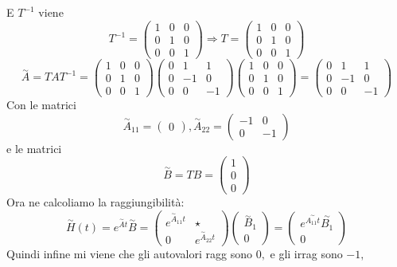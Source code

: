 \documentclass{article}
\begin{document}
E $T^{-1}$ viene \[ T^{-1} = \left(\begin{matrix}1 & 0 & 0\\0 & 1 & 0\\0 & 0 & 1\end{matrix}\right) \Longrightarrow T = \left(\begin{matrix}1 & 0 & 0\\0 & 1 & 0\\0 & 0 & 1\end{matrix}\right) \]
\[ \overset{\sim}{A} = T A  T^{-1} = \left(\begin{matrix}1 & 0 & 0\\0 & 1 & 0\\0 & 0 & 1\end{matrix}\right)\left(\begin{matrix}0 & 1 & 1\\0 & -1 & 0\\0 & 0 & -1\end{matrix}\right)\left(\begin{matrix}1 & 0 & 0\\0 & 1 & 0\\0 & 0 & 1\end{matrix}\right) = \left(\begin{matrix}0 & 1 & 1\\0 & -1 & 0\\0 & 0 & -1\end{matrix}\right) \]Con le matrici \[ \overset{\sim}{A}_{11} = \left(\begin{matrix}0\end{matrix}\right) , \overset{\sim}{A}_{22} = \left(\begin{matrix}-1 & 0\\0 & -1\end{matrix}\right)  \]e le matrici \[ \overset{\sim}{B} = TB = \left(\begin{matrix}1\\0\\0\end{matrix}\right)  \]
Ora ne calcoliamo la raggiungibilità: \[ \overset{\sim}{H}(t) = e^{\overset{\sim}{A}t}\overset{\sim}{B} = \begin{pmatrix} e^{\overset{\sim}{A}_{11}t} &  \star \\ 0 & e^{\overset{\sim}{A}_{22}t} \end{pmatrix} \begin{pmatrix} \overset{\sim}{B}_1 \\ 0 \end{pmatrix} = \begin{pmatrix} e^{\overset{\sim}{A_{11}t}}\overset{\sim}{B_1} \\ 0 \end{pmatrix} \]
Quindi infine mi viene che gli autovalori ragg sono $ 0,  $ e gli irrag sono $ -1,  $
\end{document}
